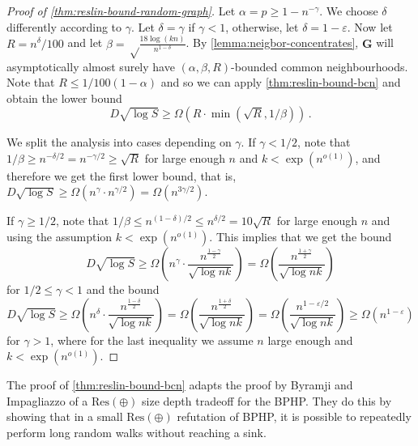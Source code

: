 \documentclass[10pt,a4paper]{article}
\theoremstyle{definition}
\theoremstyle{remark}
\theoremstyle{example}
\theoremstyle{plain}
\newcommand{\random}[1]{\bm{#1}}
\newcommand{\CNbound}{R}
\newcommand{\ResLin}{\textrm{Res}(\oplus)}
\newcommand{\edgeProbResLin}{\alpha}
\newcommand{\rbound}{1/100(1-\edgeProbResLin)}
\begin{document}
\begin{proof}[Proof of \autoref{thm:reslin-bound-random-graph}]
    Let $\edgeProbResLin = p \geq 1-n^{-\gamma}$. We choose $\delta$ differently according to $\gamma$. Let $\delta = \gamma$ if $\gamma <1$, otherwise, let $\delta = 1 - \varepsilon$. Now let $\CNbound = n^\delta/100$ and let $\beta = \sqrt\frac{18\log(kn)}{n^{1-\delta}}$.
    By \autoref{lemma:neigbor-concentrates}, $\random{G}$ will asymptotically almost surely have $(\edgeProbResLin,\beta,\CNbound)$-bounded common neighbourhoods. Note that $R \leq \rbound $
    and so we can apply \autoref{thm:reslin-bound-bcn} and obtain the lower bound 
    \begin{equation*}
        D\sqrt{\log S}\geq\Omega(\CNbound\cdot\min(\sqrt{\CNbound},1/\beta))  \,.
    \end{equation*}
    
    We split the analysis into cases depending on $\gamma$. If $\gamma < 1/2$, 
    note that $1/\beta \geq n^{-\delta/2} = n^{-\gamma/2}  \geq \sqrt{\CNbound}$ for large enough $n$ and $k< \exp(n^{o(1)})$,
    and therefore we get the first lower bound, that is,
$ D\sqrt{\log S}\geq \Omega(n^\gamma\cdot n^{\gamma/2}) = \Omega( n^{3\gamma/2})$.


    

If $\gamma \geq 1/2$, note that 
$1/\beta \leq n^{(1-\delta)/2}\leq n^{\delta/2} = 10\sqrt{\CNbound}$ for large enough $n$ and using the assumption $k< \exp(n^{o(1)})$.
This implies that we get the bound
\begin{equation*}
        D\sqrt{\log S}\geq \Omega\left(n^\gamma\cdot \frac{n^{\frac{1-\gamma}{2}}}{\sqrt{\log nk}} \right) 
        = \Omega\left(\frac{n^{\frac{1+\gamma}{2}}}{\sqrt{\log nk}} \right)
    \end{equation*}
for $1/2\leq \gamma < 1$ and the bound
   \begin{equation*}
        D\sqrt{\log S}\geq\Omega\left(n^{\delta}\cdot \frac{n^{\frac{1-\delta}{2}}}{\sqrt{\log nk}} \right) 
        = \Omega\left(\frac{n^{\frac{1+\delta}{2}}}{\sqrt{\log nk}} \right)
        = \Omega\left(\frac{n^{1 - \varepsilon/2}}{\sqrt{\log nk}} \right)
        \geq \Omega\left(n^{1 - \varepsilon}\right)
    \end{equation*}
for $\gamma > 1$, where for the last inequality we assume $n$ large enough and $k< \exp(n^{o(1)})$.

\end{proof}

The proof of \autoref{thm:reslin-bound-bcn} adapts the proof by Byramji and Impagliazzo \cite{BI25bphp} of a $\ResLin$ size depth tradeoff for the BPHP. They do this by showing that in a small $\ResLin$ refutation of BPHP, it is possible to repeatedly perform long random walks without reaching a sink. 
\end{document}
